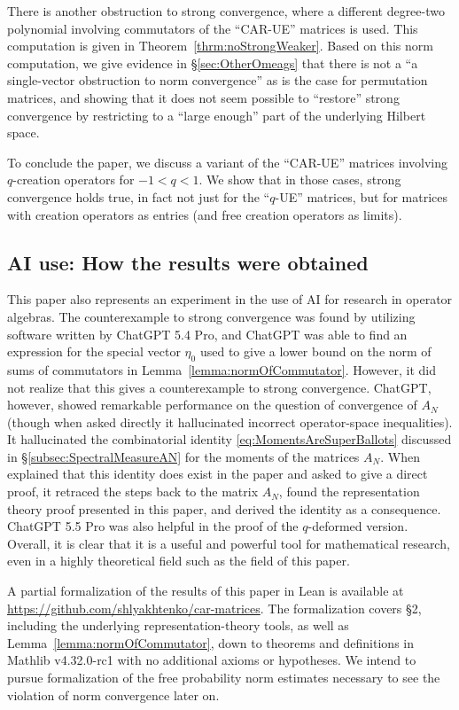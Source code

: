 \documentclass[11pt]{article}
\begin{document}
There is another obstruction to strong convergence, where a different degree-two polynomial involving commutators of the ``CAR-UE'' matrices is used.  This computation is given in Theorem~\ref{thrm:noStrongWeaker}. Based on this norm computation, we give evidence in  \S\ref{sec:OtherOmeags} that there is not a ``a single-vector obstruction to norm convergence'' as is the case for permutation matrices, and showing that it does not seem possible to ``restore'' strong convergence by restricting to a ``large enough'' part of the underlying Hilbert space.

To conclude the paper, we discuss a variant of the ``CAR-UE'' matrices involving $q$-creation operators \cite{Bozejko-Speicher:qBrownian} for $-1<q<1$. We show that in those cases, strong convergence holds true, in fact not just for the ``$q$-UE'' matrices, but for matrices with creation operators as entries (and free creation operators as limits).

\subsection{AI use: How the results were obtained}
This paper also represents an experiment in the use of AI for research in operator algebras. The counterexample to strong convergence was found by utilizing software written by ChatGPT 5.4 Pro, and ChatGPT was able to find an expression for the special vector $\eta_0$ used to give a lower bound on the norm of sums of commutators in Lemma~\ref{lemma:normOfCommutator}. However, it did not realize that this gives a counterexample to strong convergence.  ChatGPT, however, showed remarkable performance on the question of convergence of $A_N$ (though when asked directly it hallucinated incorrect operator-space inequalities). It hallucinated the combinatorial identity \eqref{eq:MomentsAreSuperBallots} discussed in  \S\ref{subsec:SpectralMeasureAN} for the moments of the matrices $A_N$. When explained that this identity does exist in the paper \cite{gessel} and asked to give a direct proof, it retraced the steps back to the matrix $A_N$, found the representation theory proof presented in this paper, and derived the identity as a consequence. ChatGPT 5.5 Pro was also helpful in the proof of the $q$-deformed version. Overall, it is clear that it is a useful and powerful tool for mathematical research, even in a highly theoretical field such as the field of this paper. 

A partial formalization of the results of this paper in Lean is available at \url{https://github.com/shlyakhtenko/car-matrices}. The formalization covers \S2, including the underlying representation-theory tools, as well as Lemma~\ref{lemma:normOfCommutator}, down to theorems and definitions in Mathlib v4.32.0-rc1 with no additional axioms or hypotheses. We intend to pursue formalization of the free probability norm estimates necessary to see the violation of norm convergence later on.
\end{document}
